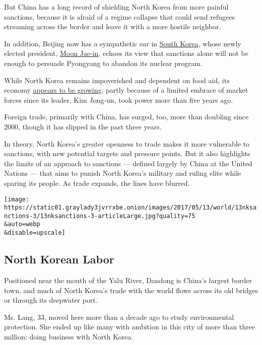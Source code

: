 But China has a long record of shielding North Korea from more painful
sanctions, because it is afraid of a regime collapse that could send
refugees streaming across the border and leave it with a more hostile
neighbor.

In addition, Beijing now has a sympathetic ear in
\href{https://www.nytimes3xbfgragh.onion/topic/destination/south-korea?8qa}{South
Korea}, whose newly elected president,
\href{https://www.nytimes3xbfgragh.onion/2017/05/09/world/asia/south-korea-election-president-moon-jae-in.html?rref=collection\%2Ftimestopic\%2FSouth\%20Korea\&action=click\&contentCollection=world\&region=stream\&module=stream_unit\&version=latest\&contentPlacement=8\&pgtype=collection}{Moon
Jae-in}, echoes its view that sanctions alone will not be enough to
persuade Pyongyang to abandon its nuclear program.

While North Korea remains impoverished and dependent on food aid, its
economy
\href{https://www.nytimes3xbfgragh.onion/2017/04/30/world/asia/north-korea-economy-marketplace.html}{appears
to be growing}, partly because of a limited embrace of market forces
since its leader, Kim Jong-un, took power more than five years ago.

Foreign trade, primarily with China, has surged, too, more than doubling
since 2000, though it has slipped in the past three years.

In theory, North Korea's greater openness to trade makes it more
vulnerable to sanctions, with new potential targets and pressure points.
But it also highlights the limits of an approach to sanctions ---
defined largely by China at the United Nations --- that aims to punish
North Korea's military and ruling elite while sparing its people. As
trade expands, the lines have blurred.

\texttt{[image: https://static01.graylady3jvrrxbe.onion/images/2017/05/13/world/13nksanctions-3/13nksanctions-3-articleLarge.jpg?quality=75\\\&auto=webp\\\&disable=upscale]}

\hypertarget{north-korean-labor}{%
\subsection{North Korean Labor}\label{north-korean-labor}}

Positioned near the mouth of the Yalu River, Dandong is China's largest
border town, and much of North Korea's trade with the world flows across
its old bridges or through its deepwater port.

Ms. Lang, 33, moved here more than a decade ago to study environmental
protection. She ended up like many with ambition in this city of more
than three million: doing business with North Korea.


